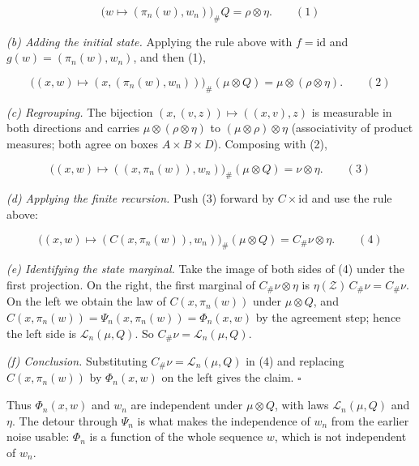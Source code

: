 \documentclass[11pt,a4paper]{article}
\begin{document}
\[\bigl(w\mapsto(\pi_n(w),w_n)\bigr)_\#Q=\rho\otimes\eta.\qquad(1)\]


\emph{(b) Adding the initial state.} Applying the rule above with \(f=\mathrm{id}\) and \(g(w)=(\pi_n(w),w_n)\), and then (1),


\[\bigl((x,w)\mapsto(x,(\pi_n(w),w_n))\bigr)_\#(\mu\otimes Q)=\mu\otimes(\rho\otimes\eta).\qquad(2)\]


\emph{(c) Regrouping.} The bijection \((x,(v,z))\mapsto((x,v),z)\) is measurable in both directions and carries \(\mu\otimes(\rho\otimes\eta)\) to \((\mu\otimes\rho)\otimes\eta\) (associativity of product measures; both agree on boxes \(A\times B\times D\)). Composing with (2),


\[\bigl((x,w)\mapsto((x,\pi_n(w)),w_n)\bigr)_\#(\mu\otimes Q)=\nu\otimes\eta.\qquad(3)\]


\emph{(d) Applying the finite recursion.} Push (3) forward by \(C\times\mathrm{id}\) and use the rule above:


\[\bigl((x,w)\mapsto(C(x,\pi_n(w)),w_n)\bigr)_\#(\mu\otimes Q)=C_\#\nu\otimes\eta.\qquad(4)\]


\emph{(e) Identifying the state marginal.} Take the image of both sides of (4) under the first projection. On the right, the first marginal of \(C_\#\nu\otimes\eta\) is \(\eta(\mathcal Z)\,C_\#\nu=C_\#\nu\). On the left we obtain the law of \(C(x,\pi_n(w))\) under \(\mu\otimes Q\), and \(C(x,\pi_n(w))=\Psi_n(x,\pi_n(w))=\Phi_n(x,w)\) by the agreement step; hence the left side is \(\mathcal L_n(\mu,Q)\). So \(C_\#\nu=\mathcal L_n(\mu,Q)\).




\emph{(f) Conclusion.} Substituting \(C_\#\nu=\mathcal L_n(\mu,Q)\) in (4) and replacing \(C(x,\pi_n(w))\) by \(\Phi_n(x,w)\) on the left gives the claim. \(\square\)




Thus \(\Phi_n(x,w)\) and \(w_n\) are independent under \(\mu\otimes Q\), with laws \(\mathcal L_n(\mu,Q)\) and \(\eta\). The detour through \(\Psi_n\) is what makes the independence of \(w_n\) from the earlier noise usable: \(\Phi_n\) is a function of the whole sequence \(w\), which is not independent of \(w_n\).
\end{document}
